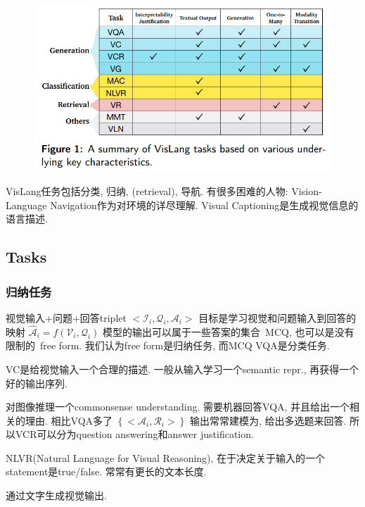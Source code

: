 \documentclass{article}
\begin{document}
\begin{figure}[htbp]
    \centering
    \includegraphics[width=\textwidth]{vl-tasks.png}
\end{figure}

VisLang任务包括分类, 归纳, (retrieval), 导航. 有很多困难的人物: Vision-Language Navigation作为对环境的详尽理解. Visual Captioning是生成视觉信息的语言描述.

\subsection{Tasks}

\subsubsection{归纳任务}

视觉输入+问题+回答triplet 
$<\mathcal{I}_{i}, \mathcal{Q}_{i}, \mathcal{A}_{i}>$
目标是学习视觉和问题输入到回答的映射
$\hat{\mathcal{A}}_{i}=f\left(\mathcal{V}_{i}, \mathcal{Q}_{i}\right)$
模型的输出可以属于一些答案的集合~MCQ,
也可以是没有限制的~free form. 
我们认为free form是归纳任务, 而MCQ VQA是分类任务.

VC是给视觉输入一个合理的描述. 一般从输入学习一个semantic repr., 再获得一个好的输出序列.

对图像推理一个commonsense understanding. 需要机器回答VQA, 并且给出一个相关的理由. 相比VQA多了
$\left\{<\mathcal{A}_{i}, \mathcal{R}_{i}>\right\}$
输出常常建模为, 给出多选题来回答. 所以VCR可以分为question answering和answer justification.

NLVR(Natural Language for Visual Reasoning), 在于决定关于输入的一个statement是true/false. 常常有更长的文本长度.

通过文字生成视觉输出.
\end{document}
